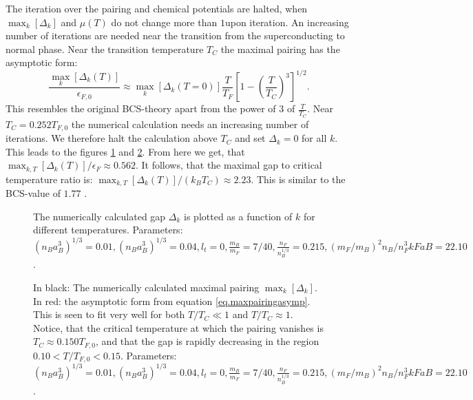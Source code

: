 The iteration over the pairing and chemical potentials are halted, when $\max_k[\Delta_k]$ and $\mu(T)$ do not change more than $1$\textperthousand upon iteration. An increasing number of iterations are needed near the transition from the superconducting to normal phase. Near the transition temperature $T_C$ the maximal pairing has the asymptotic form:
\begin{equation}
\frac{\max_{k}[\Delta_k(T)]}{\epsilon_{F,0}} \approx \max_k[\Delta_{k}(T=0)]\frac{T}{T_F}\left[1 - \left(\frac{T}{T_C}\right)^3\right]^{1/2}. 
\label{eq.maxpairingasymp}
\end{equation}
This resembles the original BCS-theory apart from the power of 3 of $\frac{T}{T_C}$. Near $T_C = 0.252 T_{F,0}$ the numerical calculation needs an increasing number of iterations. We therefore halt the calculation above $T_C$ and set $\Delta_k = 0$ for all $k$. This leads to the figures \ref{fig.Deltakkdepend} and \ref{fig.maxkDeltakTdepend}. From here we get, that $\max_{k,T}[\Delta_k(T)]/\epsilon_F \approx 0.562$. It follows, that the maximal gap to critical temperature ratio is: $\max_{k,T}[\Delta_k(T)]/(k_B T_C) \approx 2.23$. This is similar to the BCS-value of $1.77$ \cite{BruusFlensberg}.  

\begin{figure} 
\begin{center}  
  
\caption{The numerically calculated gap $\Delta_k$ is plotted as a function of $k$ for different temperatures. Parameters: $(n_Ba_B^3)^{1/3} = 0.01, (n_Ba_B^3)^{1/3} = 0.04, l_t = 0, \frac{m_B}{m_F} = 7/40, \frac{n_F}{n_B^{1/3}} = 0.215, (m_F/m_B)^2n_B/n_F^3 kFaB = 22.10$. }  
\label{fig.Deltakkdepend}  
\end{center}    
\end{figure}

\begin{figure} 
\begin{center}  
  
\caption{In black: The numerically calculated maximal pairing $\max_k[\Delta_k]$. In red: the asymptotic form from equation \eqref{eq.maxpairingasymp}. This is seen to fit very well for both $T/T_C \ll 1$ and $T/T_C \approx 1$. Notice, that the critical temperature at which the pairing vanishes is $T_C \approx 0.150 T_{F,0}$, and that the gap is rapidly decreasing in the region $0.10< T/T_{F,0} < 0.15$. Parameters: $(n_Ba_B^3)^{1/3} = 0.01, (n_Ba_B^3)^{1/3} = 0.04, l_t = 0, \frac{m_B}{m_F} = 7/40, \frac{n_F}{n_B^{1/3}} = 0.215, (m_F/m_B)^2n_B/n_F^3 kFaB = 22.10$. }  
\label{fig.maxkDeltakTdepend}  
\end{center}    
\end{figure}

